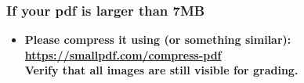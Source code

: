 \documentclass[../main.tex]{subfiles}
\begin{document}
    
    \begin{frame}[t]
        \frametitle{If your pdf is larger than 7MB}
        \begin{normalsize}
            \begin{itemize}
                \setlength\itemsep{1em}
                
                \item[] \textbf{Please compress it using (or something similar): \\
                    \selectfont\textcolor{blue}{\url{https://smallpdf.com/compress-pdf}} \\
                    Verify that all images are still visible for grading.
                }
                
            \end{itemize}
        \end{normalsize}
    \end{frame}
\end{document}
